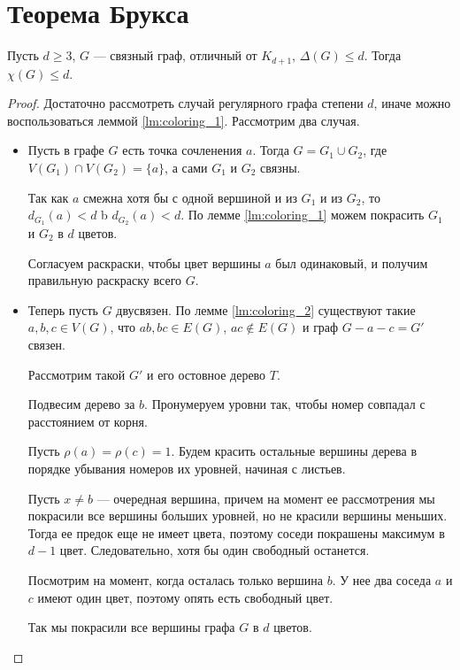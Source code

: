 \section{Теорема Брукса}
\begin{theorem}[Брукс, 1941]
	Пусть $d \ge 3$, $G$ --- связный граф, отличный от $K_{d+1}$, $\Delta(G) \le d$. Тогда $\chi(G) \le d$.
\end{theorem}
\begin{proof}
	Достаточно рассмотреть случай регулярного графа степени $d$, иначе можно воспользоваться леммой \ref{lm:coloring_1}.
	Рассмотрим два случая.
	\begin{itemize}
		\item Пусть в графе $G$ есть точка сочленения $a$. Тогда $G = G_1 \cup G_2$, где $V(G_1) \cap V(G_2) = \{a\}$, а сами $G_1$ и $G_2$ связны.

			Так как $a$ смежна хотя бы с одной вершиной и из $G_1$ и из $G_2$, то $d_{G_1}(a) < d$ b $d_{G_2}(a) <d$. 
			По лемме \ref{lm:coloring_1} можем покрасить $G_1$ и $G_2$ в $d$ цветов. 

			Согласуем раскраски, чтобы цвет вершины $a$ был одинаковый, и получим правильную раскраску всего $G$.
		\item Теперь пусть $G$ двусвязен.
			По лемме \ref{lm:coloring_2} существуют такие $a, b, c \in V(G)$, что $ab, bc \in E(G)$, $ac \notin E(G)$ и граф $G-a-c = G'$ связен.

			Рассмотрим такой $G'$ и его остовное дерево $T$.

			Подвесим дерево за $b$. Пронумеруем уровни так, чтобы номер совпадал с расстоянием от корня. 

			Пусть $\rho(a) = \rho(c) = 1$. Будем красить остальные вершины дерева в порядке убывания номеров их уровней, начиная с листьев.

			Пусть $x \neq b$ --- очередная вершина, причем на момент ее рассмотрения мы покрасили все вершины больших уровней, но не красили вершины меньших. Тогда ее предок еще не имеет цвета, поэтому соседи покрашены максимум в $d-1$ цвет. Следовательно, хотя бы один свободный останется.

			Посмотрим на момент, когда осталась только вершина $b$. У нее два соседа $a$ и $c$ имеют один цвет, поэтому опять есть свободный цвет.

			Так мы покрасили все вершины графа $G$ в $d$ цветов.
\end{itemize}
\end{proof}
